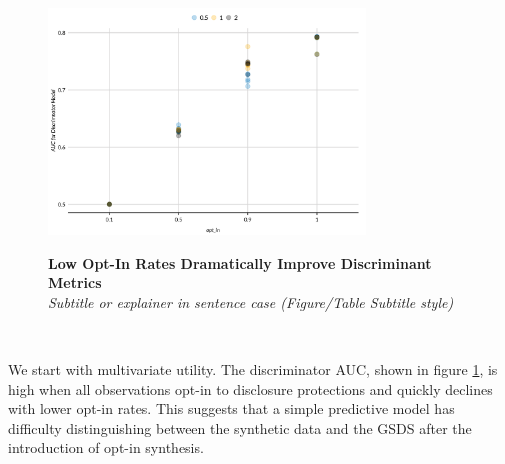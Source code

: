 \documentclass[
]{urban-formatting}
\begin{document}
\begin{figure}[htbp]
    \caption{
    \textbf{Low Opt-In Rates Dramatically Improve Discriminant Metrics}\\
    \textit{Subtitle or explainer in sentence case (Figure/Table Subtitle style)}
    }
    \centering
    \includegraphics[width=0.75\textwidth]{../analysis/figures/discriminator-auc-1.png}
    \label{fig:discriminator}
\end{figure}
\begin{singlespace}
    \\
\end{singlespace}

We start with multivariate utility. The discriminator AUC, shown in
figure \ref{fig:discriminator}, is high when all observations opt-in to
disclosure protections and quickly declines with lower opt-in rates.
This suggests that a simple predictive model has difficulty
distinguishing between the synthetic data and the GSDS after the
introduction of opt-in synthesis.
\end{document}
